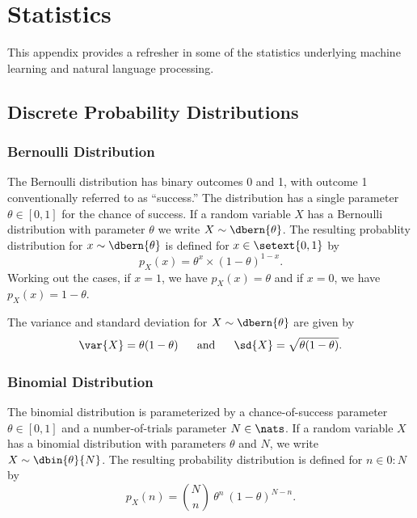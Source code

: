 \chapter{Statistics}\label{chapter:stats}

This appendix provides a refresher in some of the statistics
underlying machine learning and natural language processing.




\section{Discrete Probability Distributions}

\subsection{Bernoulli Distribution}

The Bernoulli distribution has binary outcomes 0 and 1, with outcome 1
conventionally referred to as ``success.''  The distribution has a
single parameter $\theta \in [0,1]$ for the chance of success.  If a
random variable $X$ has a Bernoulli distribution with parameter
$\theta$ we write $X \sim \dbern{\theta}$.  The resulting probablity
distribution for $x \sim \dbern{\theta}$ is defined for $x \in
\setext{0,1}$ by
%
\begin{equation}
p_X(x) = \theta^{x} \times (1 - \theta)^{1-x}.
\end{equation}
%
Working out the cases, if $x=1$, we have $p_X(x) = \theta$ and
if $x=0$, we have $p_X(x) = 1 - \theta$.

The variance and standard deviation for $X \sim \dbern{\theta}$ are
given by
%
\begin{equation}
\var{X} = \theta (1-\theta)
\ \ \ \ \ \mbox{and} \ \ \ \ \
\sd{X} = \sqrt{\theta (1 - \theta)}.
\end{equation}


\subsection{Binomial Distribution}\label{section:stats-binomial-distribution}

The binomial distribution is parameterized by a chance-of-success
parameter $\theta \in [0,1]$ and a number-of-trials parameter $N \in
\nats$.  If a random variable $X$ has a binomial distribution with
parameters $\theta$ and $N$, we write $X \sim \dbin{\theta}{N}$.  The
resulting probability distribution is defined for $n \in 0{:}N$ by
%
\begin{equation}
p_X(n) = {N \choose n} \ \theta^{n} \ (1-\theta)^{N-n}.
\end{equation}
%
%

